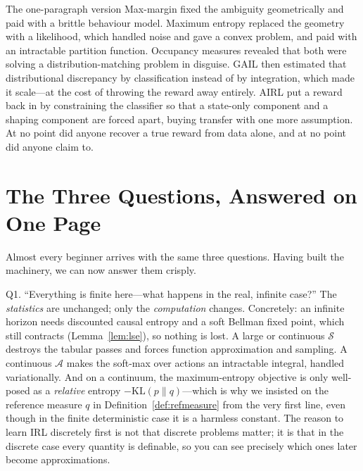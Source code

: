 \documentclass[11pt]{article}
\theoremstyle{plain}
\theoremstyle{definition}
\theoremstyle{remark}
\renewcommand{\S}{\mathcal{S}}
\newcommand{\A}{\mathcal{A}}
\newcommand{\KL}{\mathrm{KL}}
\begin{document}
\endgroup

\begin{graybox}{The one-paragraph version}
Max-margin fixed the ambiguity geometrically and paid with a brittle
behaviour model. Maximum entropy replaced the geometry with a likelihood,
which handled noise and gave a convex problem, and paid with an
intractable partition function. Occupancy measures revealed that both
were solving a distribution-matching problem in disguise. GAIL then
estimated that distributional discrepancy by classification instead of by
integration, which made it scale---at the cost of throwing the reward away
entirely. AIRL put a reward back in by constraining the classifier so that
a state-only component and a shaping component are forced apart, buying
transfer with one more assumption. At no point did anyone recover a true
reward from data alone, and at no point did anyone claim to.
\end{graybox}

\section{The Three Questions, Answered on One Page}

Almost every beginner arrives with the same three questions. Having built
the machinery, we can now answer them crisply.

\begin{graybox}{Q1. ``Everything is finite here---what happens in the
real, infinite case?''}
The \emph{statistics} are unchanged; only the \emph{computation} changes.
Concretely: an infinite horizon needs discounted causal entropy and a soft
Bellman fixed point, which still contracts (Lemma~\ref{lem:lse}), so
nothing is lost. A large or continuous $\S$ destroys the tabular passes
and forces function approximation and sampling. A continuous $\A$ makes
the soft-max over actions an intractable integral, handled variationally.
And on a continuum, the maximum-entropy objective is only well-posed as a
\emph{relative} entropy $-\KL(p\|q)$---which is why we insisted on the
reference measure $q$ in Definition~\ref{def:refmeasure} from the very
first line, even though in the finite deterministic case it is a harmless
constant. The reason to learn IRL discretely first is not that discrete
problems matter; it is that in the discrete case every quantity is
definable, so you can see precisely which ones later become
approximations.
\end{graybox}
\end{document}
